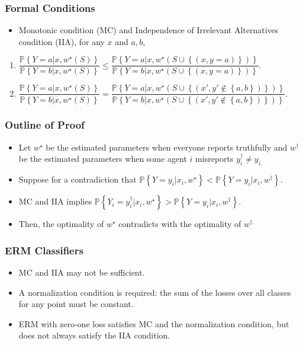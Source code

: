 \documentclass{beamer}
\begin{document}
\begin{frame} \frametitle{Formal Conditions}
\begin{itemize}
\item Monotonic condition (MC) and Independence of Irrelevant Alternatives condition (IIA), for any $x $ and $a , b, $
\end{itemize}
\begin{enumerate}
\item $\dfrac{\mathbb{P}\left\{Y = a | x, w^\star \left(S\right)\right\}}{\mathbb{P}\left\{Y = b | x, w^\star \left(S\right)\right\}} \leq  \dfrac{\mathbb{P}\left\{Y = a | x, w^\star \left(S \cup \left\{\left(x, y = a\right)\right\}\right)\right\}}{\mathbb{P}\left\{Y = b | x, w^\star \left(S \cup \left\{\left(x, y = a\right)\right\}\right)\right\}}.$
\item $\dfrac{\mathbb{P}\left\{Y = a | x, w^\star \left(S\right)\right\}}{\mathbb{P}\left\{Y = b | x, w^\star \left(S\right)\right\}} = \dfrac{\mathbb{P}\left\{Y = a | x, w^\star \left(S \cup \left\{\left(x', y' \notin \left\{a, b\right\}\right)\right\}\right)\right\}}{\mathbb{P}\left\{Y = b | x, w^\star \left(S \cup \left\{\left(x', y' \notin \left\{a, b\right\}\right)\right\}\right)\right\}}.$
\end{enumerate}

\end{frame}

\begin{frame} \frametitle{Outline of Proof}
\begin{itemize}
\item Let $w^\star $ be the estimated parameters when everyone reports truthfully and $w^{\dagger}$ be the estimated parameters when some agent $i $ misreports $y^{\dagger}_{i} \neq  y_{i.}$
\item Suppose for a contradiction that $\mathbb{P}\left\{Y = y_{i} | x_{i}, w^\star \right\} < \mathbb{P}\left\{Y = y_{i} | x_{i}, w^{\dagger}\right\}$.
\item MC and IIA implies $\mathbb{P}\left\{Y_{i} = y^{\dagger}_{i} | x_{i}, w^\star \right\} > \mathbb{P}\left\{Y = y_{i} | x_{i}, w^{\dagger}\right\}$.
\item Then, the optimality of $w^\star $ contradicts with the optimality of $w^{\dagger.}$
\end{itemize}
\end{frame}

\begin{frame} \frametitle{ERM Classifiers}
\begin{itemize}
\item MC and IIA may not be sufficient.
\item A normalization condition is required: the sum of the losses over all classes for any point must be constant.
\item ERM with zero-one loss satisfies MC and the normalization condition, but does not always satisfy the IIA condition.
\end{itemize}
\end{frame}
\end{document}
